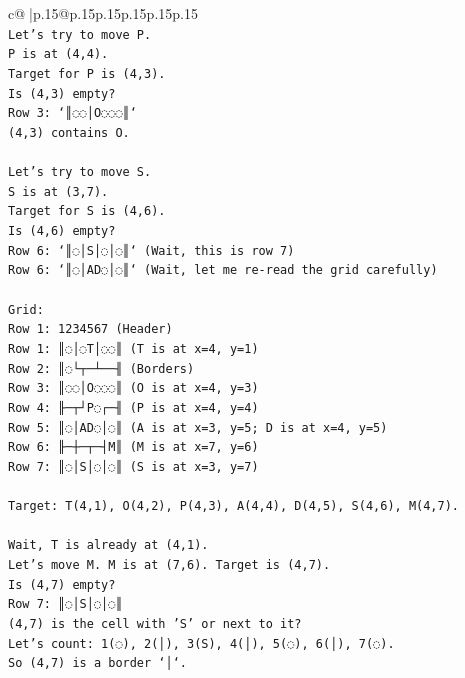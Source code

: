 \documentclass{article}
\begin{document}
{\begin{supertabular}{c@{$\;$}|p{.15\linewidth}@{}p{.15\linewidth}p{.15\linewidth}p{.15\linewidth}p{.15\linewidth}p{.15\linewidth}}
{{{\\ 
\texttt{Let's try to move P.} \\
\texttt{P is at (4,4).} \\
\texttt{Target for P is (4,3).} \\
\texttt{Is (4,3) empty?} \\
\texttt{Row 3: `║◌◌│O◌◌◌║`} \\
\texttt{(4,3) contains O.} \\
\\ 
\texttt{Let's try to move S.} \\
\texttt{S is at (3,7).} \\
\texttt{Target for S is (4,6).} \\
\texttt{Is (4,6) empty?} \\
\texttt{Row 6: `║◌│S│◌│◌║` (Wait, this is row 7)} \\
\texttt{Row 6: `║◌│AD◌│◌║` (Wait, let me re{-}read the grid carefully)} \\
\\ 
\texttt{Grid:} \\
\texttt{Row 1: 1234567 (Header)} \\
\texttt{Row 1: ║◌│◌T│◌◌║ (T is at x=4, y=1)} \\
\texttt{Row 2: ║◌└┬─┴──╢ (Borders)} \\
\texttt{Row 3: ║◌◌│O◌◌◌║ (O is at x=4, y=3)} \\
\texttt{Row 4: ╟─┬┘P◌┌─╢ (P is at x=4, y=4)} \\
\texttt{Row 5: ║◌│AD◌│◌║ (A is at x=3, y=5; D is at x=4, y=5)} \\
\texttt{Row 6: ╟─┼─┬─┤M║ (M is at x=7, y=6)} \\
\texttt{Row 7: ║◌│S│◌│◌║ (S is at x=3, y=7)} \\
\\ 
\texttt{Target: T(4,1), O(4,2), P(4,3), A(4,4), D(4,5), S(4,6), M(4,7).} \\
\\ 
\texttt{Wait, T is already at (4,1).} \\
\texttt{Let's move M. M is at (7,6). Target is (4,7).} \\
\texttt{Is (4,7) empty?} \\
\texttt{Row 7: ║◌│S│◌│◌║} \\
\texttt{(4,7) is the cell with 'S' or next to it?} \\
\texttt{Let's count: 1(◌), 2(│), 3(S), 4(│), 5(◌), 6(│), 7(◌).} \\
\texttt{So (4,7) is a border `│`.} \\
}}}
\end{supertabular}}
\end{document}
